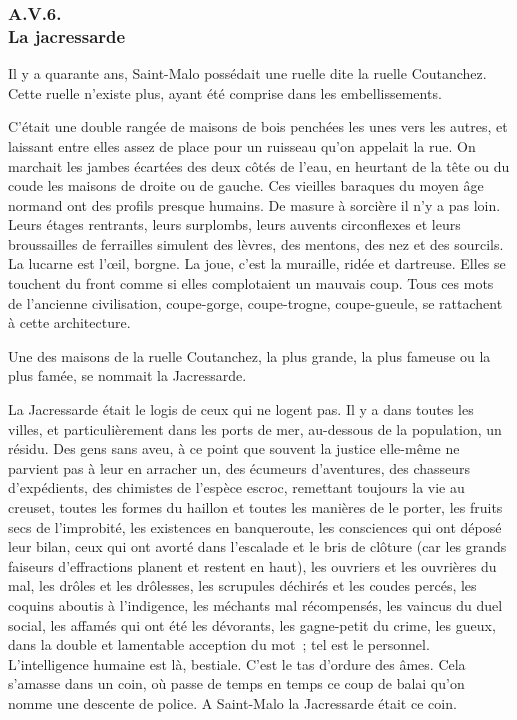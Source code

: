 \documentclass[french,twoside]{book} %
\begin{document}
 \subsubsection[{A.V.6. La jacressarde}]{A.V.6. \\
La jacressarde}
\noindent Il y a quarante ans, Saint-Malo possédait une ruelle dite la ruelle Coutanchez. Cette ruelle n’existe plus, ayant été comprise dans les embellissements.\par
C’était une double rangée de maisons de bois penchées les unes vers les autres, et laissant entre elles assez de place pour un ruisseau qu’on appelait la rue. On marchait les jambes écartées des deux côtés de l’eau, en heurtant de la tête ou du coude les maisons de droite ou de gauche. Ces vieilles baraques du moyen âge normand ont des profils presque humains. De masure à sorcière il n’y a pas loin. Leurs étages rentrants, leurs surplombs, leurs auvents circonflexes et leurs broussailles de ferrailles simulent des lèvres, des mentons, des nez et des sourcils. La lucarne est l’œil, borgne. La joue, c’est la muraille, ridée et dartreuse. Elles se touchent du front comme si elles complotaient un mauvais coup. Tous ces mots de l’ancienne civilisation, coupe-gorge, coupe-trogne, coupe-gueule, se rattachent à cette architecture.\par
 Une des maisons de la ruelle Coutanchez, la plus grande, la plus fameuse ou la plus famée, se nommait la Jacressarde.\par
La Jacressarde était le logis de ceux qui ne logent pas. Il y a dans toutes les villes, et particulièrement dans les ports de mer, au-dessous de la population, un résidu. Des gens sans aveu, à ce point que souvent la justice elle-même ne parvient pas à leur en arracher un, des écumeurs d’aventures, des chasseurs d’expédients, des chimistes de l’espèce escroc, remettant toujours la vie au creuset, toutes les formes du haillon et toutes les manières de le porter, les fruits secs de l’improbité, les existences en banqueroute, les consciences qui ont déposé leur bilan, ceux qui ont avorté dans l’escalade et le bris de clôture (car les grands faiseurs d’effractions planent et restent en haut), les ouvriers et les ouvrières du mal, les drôles et les drôlesses, les scrupules déchirés et les coudes percés, les coquins aboutis à l’indigence, les méchants mal récompensés, les vaincus du duel social, les affamés qui ont été les dévorants, les gagne-petit du crime, les gueux, dans la double et lamentable acception du mot ; tel est le personnel. L’intelligence humaine est là, bestiale. C’est le tas d’ordure des âmes. Cela s’amasse dans un coin, où passe de temps en temps ce coup de balai qu’on nomme une descente de police. A Saint-Malo la Jacressarde était ce coin.\par
\end{document}
